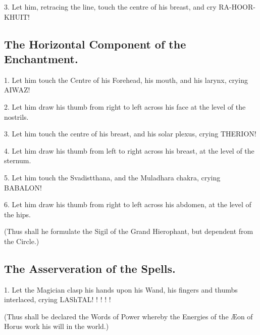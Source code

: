 3. Let him, retracing the line, touch the centre of his breast, and cry RA-HOOR-KHUIT!

\subsection*{The Horizontal Component of the Enchantment.}

1. Let him touch the Centre of his Forehead, his mouth, and his larynx, crying AIWAZ!

2. Let him draw his thumb from right to left across his face at the level of the nostrils.

3. Let him touch the centre of his breast, and his solar plexus, crying THERION!

4. Let him draw his thumb from left to right across his breast, at the level of the sternum.

5. Let him touch the Svadistthana, and the Muladhara chakra, crying BABALON!

6. Let him draw his thumb from right to left across his abdomen, at the level of the hips.

(Thus shall he formulate the Sigil of the Grand Hierophant, but dependent from the Circle.)

\subsection*{The Asserveration of the Spells.}

1. Let the Magician clasp his hands upon his Wand, his fingers and thumbs interlaced, crying LAShTAL! \Thelema{}! \FIAOF{}! \Agape{}! \Aumgn{}!

(Thus shall be declared the Words of Power whereby the Energies of the \AE{}on of Horus work his will in the world.)

